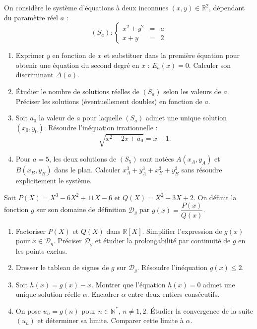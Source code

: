 \documentclass[11pt]{article}
\begin{document}
\begin{exercice}
On considère le système d'équations à deux inconnues $(x,y) \in \mathbb{R}^2$, dépendant du paramètre réel $a$ :
\[
(S_a) : \left\lbrace \begin{array}{rcl} x^2 + y^2 &=& a \\ x + y &=& 2 \end{array} \right.
\]
\begin{enumerate}
    \item Exprimer $y$ en fonction de $x$ et substituer dans la première équation pour obtenir une équation du second degré en $x$ : $E_a(x)=0$. Calculer son discriminant $\Delta(a)$.
    \item Étudier le nombre de solutions réelles de $(S_a)$ selon les valeurs de $a$. Préciser les solutions (éventuellement doubles) en fonction de $a$.
    \item Soit $a_0$ la valeur de $a$ pour laquelle $(S_a)$ admet une unique solution $(x_0,y_0)$. Résoudre l'inéquation irrationnelle :
    \[
    \sqrt{x^2 - 2x + a_0} = x - 1.
    \]
    \item Pour $a=5$, les deux solutions de $(S_5)$ sont notées $A(x_A,y_A)$ et $B(x_B,y_B)$ dans le plan. Calculer $x_A^3+y_A^3+x_B^3+y_B^3$ sans résoudre explicitement le système.
\end{enumerate}
\end{exercice}

\begin{exercice}
Soit $P(X)=X^3-6X^2+11X-6$ et $Q(X)=X^2-3X+2$. On définit la fonction $g$ sur son domaine de définition $\mathcal{D}_g$ par $g(x)=\dfrac{P(x)}{Q(x)}$.
\begin{enumerate}
    \item Factoriser $P(X)$ et $Q(X)$ dans $\mathbb{R}[X]$. Simplifier l'expression de $g(x)$ pour $x \in \mathcal{D}_g$. Préciser $\mathcal{D}_g$ et étudier la prolongabilité par continuité de $g$ en les points exclus.
    \item Dresser le tableau de signes de $g$ sur $\mathcal{D}_g$. Résoudre l'inéquation $g(x) \leqslant 2$.
    \item Soit $h(x)=g(x)-x$. Montrer que l'équation $h(x)=0$ admet une unique solution réelle $\alpha$. Encadrer $\alpha$ entre deux entiers consécutifs.
    \item On pose $u_n = g(n)$ pour $n \in \mathbb{N}^*$, $n \neq 1,2$. Étudier la convergence de la suite $(u_n)$ et déterminer sa limite. Comparer cette limite à $\alpha$.
\end{enumerate}
\end{exercice}
\end{document}
